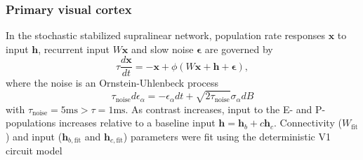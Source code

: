 \documentclass[11pt]{article}
\begin{document}
\subsubsection{Primary visual cortex}\label{methods_V1}
In the stochastic stabilized supralinear network, population rate responses $\mathbf{x}$ to input $\mathbf{h}$, recurrent input $W\mathbf{x}$ and slow noise $\bm{\epsilon}$ are governed by
\begin{equation}
    \tau \frac{d\mathbf{x}}{dt} = -\mathbf{x} +\phi(W\mathbf{x} + \mathbf{h} + \bm{\epsilon}),
\end{equation}
where the noise is an Ornstein-Uhlenbeck process
\begin{equation}
\tau_{\text{noise}} d\epsilon_\alpha = -\epsilon_\alpha dt + \sqrt{2\tau_{\text{noise}}}\sigma_\alpha dB
\end{equation}
with $\tau_{\text{noise}} = 5\text{ms} > \tau = 1\text{ms}$.
As contrast increases, input to the E- and P-populations increases  relative to a baseline input $\mathbf{h} = \mathbf{h}_b + c\mathbf{h}_c$.
Connectivity ($W_{\text{fit}}$) and input ($\mathbf{h}_{b,\text{fit}}$ and $\mathbf{h}_{c,\text{fit}}$) parameters were fit using the deterministic V1 circuit model \cite{palmigiano2020structure} 
\end{document}
